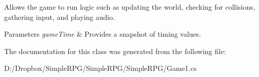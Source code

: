 Allows the game to run logic such as updating the world, checking for collisions, gathering input, and playing audio. 


\begin{DoxyParams}{Parameters}
{\em game\+Time} & Provides a snapshot of timing values.\\
\hline
\end{DoxyParams}


The documentation for this class was generated from the following file\+:\begin{DoxyCompactItemize}
\item 
D\+:/\+Dropbox/\+Simple\+R\+P\+G/\+Simple\+R\+P\+G/\+Simple\+R\+P\+G/Game1.\+cs\end{DoxyCompactItemize}
